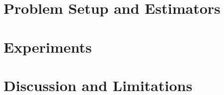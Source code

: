 \documentclass{article}
\begin{document}
\section{Problem Setup and Estimators}
\label{sec:method}


\section{Experiments}
\label{sec:experiments}


\section{Discussion and Limitations}
\label{sec:discussion}





\appendix


\clearpage

\end{document}
